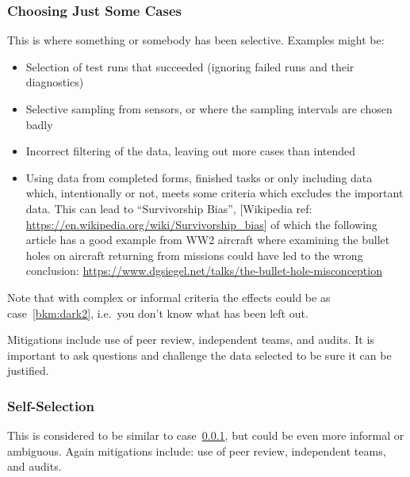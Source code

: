\subsubsection{Choosing Just Some Cases}\label{bkm:dark3}
This is where something or somebody has been selective. Examples might be:
\begin{itemize}
\item Selection of test runs that succeeded (ignoring failed runs and their diagnostics) 
  \item Selective sampling from sensors, or where the sampling intervals are chosen badly
  \item Incorrect filtering of the data, leaving out more cases than intended
  \item Using data from completed forms, finished tasks or only including data which,
    intentionally or not, meets some criteria which excludes the important data.
    This can lead to ``Survivorship Bias'',
    [Wikipedia ref:
      \href{https://en.wikipedia.org/wiki/Survivorship\_bias}
           {https://en.wikipedia.org/wiki/Survivorship\_bias}]
    of which the following article has a good example from WW2 aircraft where examining the bullet
    holes on aircraft returning from missions could have led to the wrong conclusion:
    \href{https://www.dgsiegel.net/talks/the-bullet-hole-misconception}
         {https://www.dgsiegel.net/talks/the-bullet-hole-misconception}
\end{itemize}
Note that with complex or informal criteria the effects could be as case~\ref{bkm:dark2}, i.e.\ you don’t know what has been left out.

Mitigations include use of peer review, independent teams, and audits. It is important to ask questions and challenge the data selected to be sure it can be justified.

\subsubsection{Self-Selection}\label{bkm:dark4}
This is considered to be similar to case~\ref{bkm:dark3}, but could be even more informal or ambiguous. Again mitigations include: use of peer review, independent teams, and audits.

